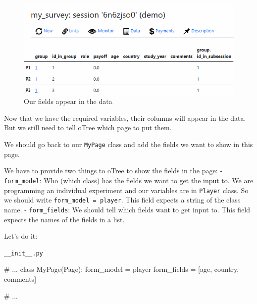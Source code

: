 \documentclass[
  letterpaper,
  DIV=11,
  numbers=noendperiod]{scrreprt}
\newenvironment{Shaded}{\begin{snugshade}}{\end{snugshade}}
\newcommand{\CommentTok}[1]{\textcolor[rgb]{0.37,0.37,0.37}{#1}}
\newcommand{\KeywordTok}[1]{\textcolor[rgb]{0.00,0.23,0.31}{#1}}
\newcommand{\NormalTok}[1]{\textcolor[rgb]{0.00,0.23,0.31}{#1}}
\newcommand{\OperatorTok}[1]{\textcolor[rgb]{0.37,0.37,0.37}{#1}}
\newcommand{\StringTok}[1]{\textcolor[rgb]{0.13,0.47,0.30}{#1}}
\begin{document}
\begin{figure}

{\centering \includegraphics{part_otree/survey_dataadded.png}

}

\caption{\label{fig-survey-dataadded}Our fields appear in the data}

\end{figure}

Now that we have the required variables, their columns will appear in
the data. But we still need to tell oTree which page to put them.

We should go back to our \texttt{MyPage} class and add the fields we
want to show in this page.

We have to provide two things to oTree to show the fields in the page: -
\texttt{form\_model}: Who (which class) has the fields we want to get
the input to. We are programming an individual experiment and our
variables are in \texttt{Player} class. So we should write
\texttt{form\_model\ =\ \textquotesingle{}player\textquotesingle{}}.
This field expects a string of the class name. - \texttt{form\_fields}:
We should tell which fields want to get input to. This field expects the
names of the fields in a list.

Let's do it:

\begin{codelisting}

\caption{\texttt{__init__.py}}

\begin{Shaded}
\begin{Highlighting}[]
\CommentTok{\# ...}
\KeywordTok{class}\NormalTok{ MyPage(Page):}
\NormalTok{    form\_model }\OperatorTok{=} \StringTok{\textquotesingle{}player\textquotesingle{}}
\NormalTok{    form\_fields }\OperatorTok{=}\NormalTok{ [}\StringTok{\textquotesingle{}age\textquotesingle{}}\NormalTok{, }\StringTok{\textquotesingle{}country\textquotesingle{}}\NormalTok{, }\StringTok{\textquotesingle{}comments\textquotesingle{}}\NormalTok{]}

\CommentTok{\# ...}
\end{Highlighting}
\end{Shaded}

\end{codelisting}
\end{document}
